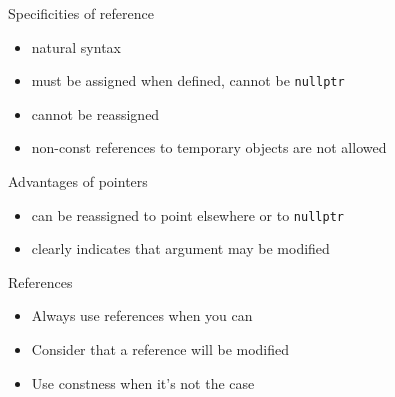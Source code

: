 \begin{frame}[fragile]
  \begin{block}{Specificities of reference}
    \begin{itemize}
    \item natural syntax
    \item must be assigned when defined, cannot be \texttt{nullptr}
    \item cannot be reassigned
    \item non-const references to temporary objects are not allowed
    \end{itemize}
  \end{block}
  \begin{block}{Advantages of pointers}
    \begin{itemize}
    \item can be reassigned to point elsewhere or to \texttt{nullptr}
    \item clearly indicates that argument may be modified
    \end{itemize}
  \end{block}
  \pause
  \begin{goodpractice}{References}
    \begin{itemize}
      \item Always use references when you can
      \item Consider that a reference will be modified
      \item Use constness when it's not the case
    \end{itemize}
  \end{goodpractice}
\end{frame}
